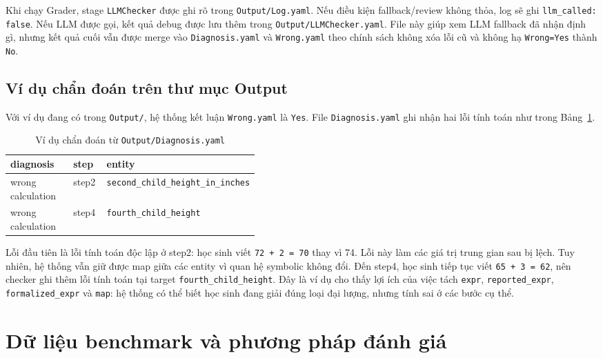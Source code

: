 \documentclass[12pt,a4paper]{article}
\begin{document}
Khi chạy Grader, stage \texttt{LLMChecker} được ghi rõ trong
\texttt{Output/Log.yaml}. Nếu điều kiện fallback/review không thỏa, log sẽ ghi
\texttt{llm\_called: false}. Nếu LLM được gọi, kết quả debug được lưu thêm trong
\texttt{Output/LLMChecker.yaml}. File này giúp xem LLM fallback đã nhận định gì,
nhưng kết quả cuối vẫn được merge vào \texttt{Diagnosis.yaml} và
\texttt{Wrong.yaml} theo chính sách không xóa lỗi cũ và không hạ
\texttt{Wrong=Yes} thành \texttt{No}.

\subsection{Ví dụ chẩn đoán trên thư mục Output}

Với ví dụ đang có trong \texttt{Output/}, hệ thống kết luận
\texttt{Wrong.yaml} là \texttt{Yes}. File \texttt{Diagnosis.yaml} ghi nhận hai
lỗi tính toán như trong Bảng~\ref{tab:diagnosis-current-example}.

\begin{table}[H]
\centering
\small
\renewcommand{\arraystretch}{1.35}
\begin{tabularx}{\linewidth}{@{}p{0.28\linewidth}p{0.14\linewidth}X@{}}
\toprule
\textbf{diagnosis} & \textbf{step} & \textbf{entity} \\
\midrule
wrong calculation & step2 & \texttt{second\_child\_height\_in\_inches} \\
wrong calculation & step4 & \texttt{fourth\_child\_height} \\
\bottomrule
\end{tabularx}
\caption{Ví dụ chẩn đoán từ \texttt{Output/Diagnosis.yaml}}
\label{tab:diagnosis-current-example}
\end{table}

Lỗi đầu tiên là lỗi tính toán độc lập ở step2: học sinh viết
\texttt{72 + 2 = 70} thay vì 74. Lỗi này làm các giá trị trung gian sau bị lệch.
Tuy nhiên, hệ thống vẫn giữ được map giữa các entity vì quan hệ symbolic không
đổi. Đến step4, học sinh tiếp tục viết \texttt{65 + 3 = 62}, nên checker ghi
thêm lỗi tính toán tại target \texttt{fourth\_child\_height}. Đây là ví dụ cho
thấy lợi ích của việc tách \texttt{expr}, \texttt{reported\_expr},
\texttt{formalized\_expr} và \texttt{map}: hệ thống có thể biết học sinh đang
giải đúng loại đại lượng, nhưng tính sai ở các bước cụ thể.

\section{Dữ liệu benchmark và phương pháp đánh giá}
\end{document}
